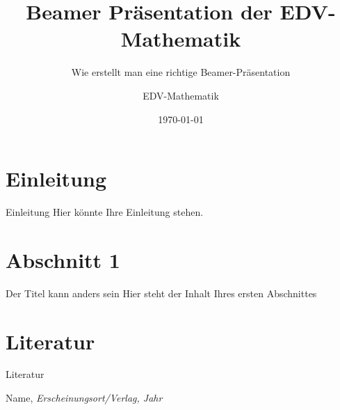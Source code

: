 \documentclass{beamer}
\numberwithin{equation}{section} %
\theoremstyle{definition}
\begin{document}
\usenavigationsymbolstemplate{}
\title{Beamer Präsentation der EDV-Mathematik} %
\subtitle{Wie erstellt man eine richtige Beamer-Präsentation} %
\author{EDV-Mathematik}  %
\date{\today} %

\frame{\titlepage} %

\frame{\tableofcontents} %
\section{Einleitung} %
\begin{frame}{Einleitung} %
Hier könnte Ihre Einleitung stehen.
\end{frame}

\section{Abschnitt 1}
\begin{frame}{Der Titel kann anders sein} %
Hier steht der Inhalt Ihres ersten Abschnittes
\end{frame}
\section{Literatur}
\begin{frame}{Literatur}
\begin{thebibliography}{999}
\vspace{2.mm}
	 Name, {\sl  Erscheinungsort/Verlag, Jahr}  
		\vspace*{0.4cm}
		
				
\end{thebibliography}

\end{frame}
\end{document}
